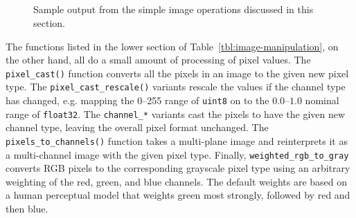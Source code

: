 \begin{figure}[p]
\centering
  \hfil
  \\
  \hfil
  \hfil
  \\
  \hfil
  \\
  \hfil
  \\
  \hfil
\caption{Sample output from the simple image operations discussed in this section.}
\label{fig:simple}
\end{figure}

The functions listed in the lower section of Table~\ref{tbl:image-manipulation},
on the other hand, all do a small amount of processing of pixel values.
The \verb#pixel_cast()# function converts all the pixels in an image to the
given new pixel type.  The \verb#pixel_cast_rescale()# variants rescale the
values if the channel type has changed, e.g. mapping the 0--255 range of
\verb#uint8# on to the $0.0$--$1.0$ nominal range of \verb#float32#.  The
\verb#channel_*# variants cast the pixels to have the given new channel type,
leaving the overall pixel format unchanged.  The \verb#pixels_to_channels()#
function takes a multi-plane image and reinterprets it as a multi-channel
image with the given pixel type.  Finally, \verb#weighted_rgb_to_gray# converts
RGB pixels to the corresponding grayscale pixel type using an arbitrary
weighting of the red, green, and blue channels.  The default weights are
based on a human perceptual model that weights green most strongly, followed
by red and then blue.


